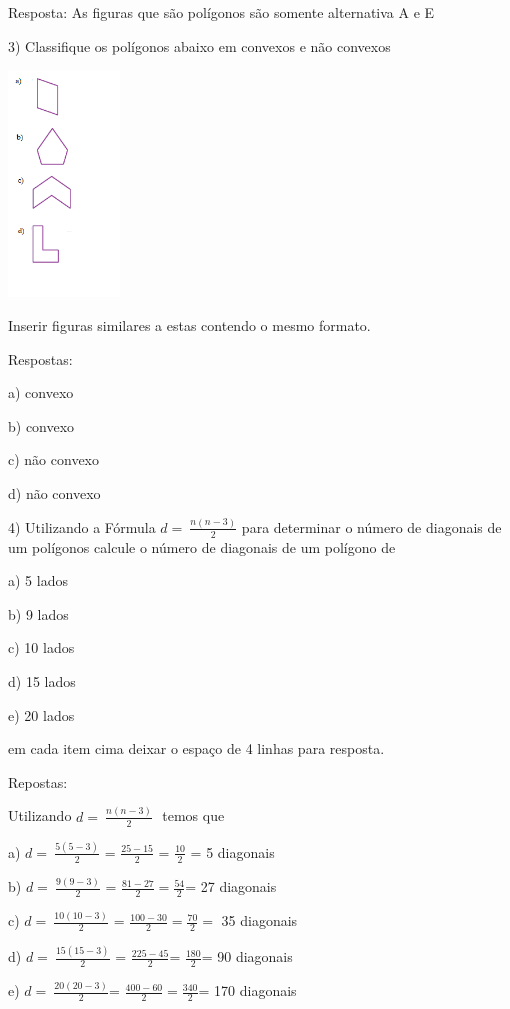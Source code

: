 {Resposta: As figuras que são polígonos são somente alternativa A e E

3) Classifique os polígonos abaixo em convexos e não convexos

\includegraphics[width=1.16236in,height=2.36667in]{./imgSAEB_8_MAT/media/image8.png}

Inserir figuras similares a estas contendo o mesmo formato.

Respostas:

a) convexo

b) convexo

c) não convexo

d) não convexo

4) Utilizando a Fórmula \(d = \ \frac{n(n - 3)}{2}\) para determinar o
número de diagonais de um polígonos calcule o número de diagonais de um
polígono de

a) 5 lados

b) 9 lados

c) 10 lados

d) 15 lados

e) 20 lados

em cada item cima deixar o espaço de 4 linhas para resposta.

Repostas:

Utilizando \(d = \ \frac{n(n - 3)}{2}\text{\ \ }\)temos que

a) \(d = \ \frac{5(5 - 3)}{2}\) = \(\frac{25 - 15}{2}\) =
\(\frac{10}{2}\) = 5 diagonais

b) \(d = \ \frac{9(9 - 3)}{2}\) = \(\frac{81 - 27}{2} = \frac{54}{2}\)=
27 diagonais

c) \(d = \ \frac{10(10 - 3)}{2}\) =
\(\frac{100 - 30}{2} = \frac{70}{2} =\) 35 diagonais

d) \(d = \ \frac{15(15 - 3)}{2}\) = \(\frac{225 - 45}{2}\)=
\(\frac{180}{2}\)= 90 diagonais

e) \(d = \ \frac{20(20 - 3)}{2}\)=
\(\frac{400 - 60}{2} = \frac{340}{2}\)= 170 diagonais

}
